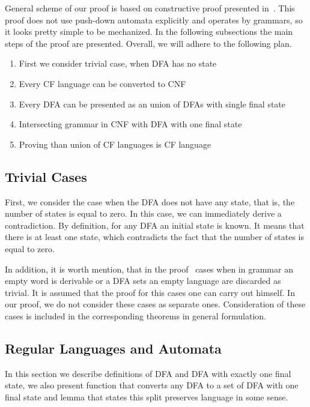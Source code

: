 General scheme of our proof is based on constructive proof presented in~\cite{beigelproof}.
This proof does not use push-down automata explicitly and operates by grammars, so it looks pretty simple to be mechanized.
In the following subsections the main steps of the proof are presented. Overall, we will adhere to the following plan. 

\begin{enumerate}
    \item First we consider trivial case, when DFA has no state
    \item Every CF language can be converted to CNF
    \item Every DFA can be presented as an union of DFAs with single final state
    \item Intersecting grammar in CNF with DFA with one final state
    \item Proving than union of CF languages is CF language
\end{enumerate}

\subsection{Trivial Cases}

First, we consider the case when the DFA does not have any state, that is, the number of states is equal to zero. 
In this case, we can immediately derive a contradiction.
By definition, for any DFA an initial state is known. 
It means that there is at least one state, which contradicts the fact that the number of states is equal to zero.

In addition, it is worth mention, that in the proof~\cite{beigelproof} cases when in grammar an empty word is derivable or a DFA sets an empty language are discarded as trivial.
It is assumed that the proof for this cases one can carry out himself.
In our proof, we do not consider these cases as separate ones.
Consideration of these cases is included in the corresponding theorems in general formulation.

\subsection{Regular Languages and Automata}

In this section we describe definitions of DFA and DFA with exactly one final state, we also present function that converts any DFA to a set of DFA with one final state and lemma that states this split preserves language in some sense.

